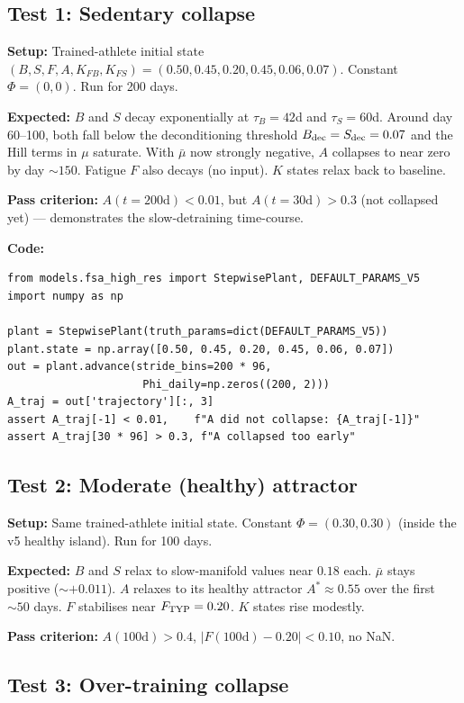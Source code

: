 \documentclass[11pt,a4paper]{article}
\theoremstyle{definition}
\begin{document}
\subsection{Test 1: Sedentary collapse}

\textbf{Setup:} Trained-athlete initial state $(B, S, F, A, K_{FB},
K_{FS}) = (0.50, 0.45, 0.20, 0.45, 0.06, 0.07)$. Constant
$\Phi = (0, 0)$. Run for 200 days.

\textbf{Expected:} $B$ and $S$ decay exponentially at $\tau_B = 42$d
and $\tau_S = 60$d. Around day 60--100, both fall below the
deconditioning threshold $B_{\rm dec} = S_{\rm dec} = 0.07$ and the
Hill terms in $\mu$ saturate. With $\bar\mu$ now strongly negative,
$A$ collapses to near zero by day $\sim 150$. Fatigue $F$ also decays
(no input). $K$ states relax back to baseline.

\textbf{Pass criterion:} $A(t = 200\text{d}) < 0.01$, but $A(t =
30\text{d}) > 0.3$ (not collapsed yet) --- demonstrates the
slow-detraining time-course.

\textbf{Code:}
\begin{lstlisting}
from models.fsa_high_res import StepwisePlant, DEFAULT_PARAMS_V5
import numpy as np

plant = StepwisePlant(truth_params=dict(DEFAULT_PARAMS_V5))
plant.state = np.array([0.50, 0.45, 0.20, 0.45, 0.06, 0.07])
out = plant.advance(stride_bins=200 * 96,
                     Phi_daily=np.zeros((200, 2)))
A_traj = out['trajectory'][:, 3]
assert A_traj[-1] < 0.01,    f"A did not collapse: {A_traj[-1]}"
assert A_traj[30 * 96] > 0.3, f"A collapsed too early"
\end{lstlisting}

\subsection{Test 2: Moderate (healthy) attractor}

\textbf{Setup:} Same trained-athlete initial state. Constant
$\Phi = (0.30, 0.30)$ (inside the v5 healthy island). Run for 100 days.

\textbf{Expected:} $B$ and $S$ relax to slow-manifold values near
$0.18$ each. $\bar\mu$ stays positive ($\sim +0.011$). $A$ relaxes to
its healthy attractor $A^* \approx 0.55$ over the first $\sim 50$ days.
$F$ stabilises near $F_{\rm TYP} = 0.20$. $K$ states rise modestly.

\textbf{Pass criterion:} $A(100\text{d}) > 0.4$, $|F(100\text{d}) - 0.20| < 0.10$, no
NaN.

\subsection{Test 3: Over-training collapse}
\end{document}

